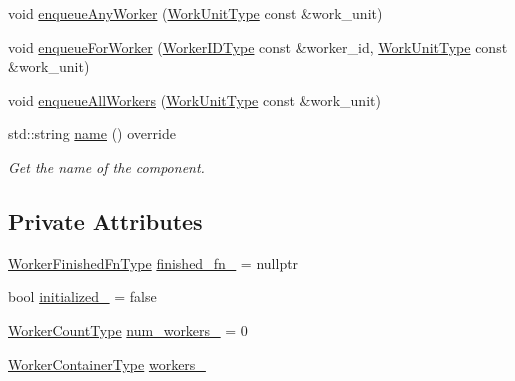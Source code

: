 \begin{DoxyCompactItemize}
\item 
void \hyperlink{structvt_1_1worker_1_1_worker_group_any_a9f8a255853db11824212dcba4faaaf13}{enqueue\+Any\+Worker} (\hyperlink{namespacevt_1_1worker_a59d2fcdafa81fc0af7f921a258e42202}{Work\+Unit\+Type} const \&work\+\_\+unit)
\item 
void \hyperlink{structvt_1_1worker_1_1_worker_group_any_a7f800682c86f876c626d3ee1b9735680}{enqueue\+For\+Worker} (\hyperlink{namespacevt_a656e362091da17b9b93d0655b36e3392}{Worker\+I\+D\+Type} const \&worker\+\_\+id, \hyperlink{namespacevt_1_1worker_a59d2fcdafa81fc0af7f921a258e42202}{Work\+Unit\+Type} const \&work\+\_\+unit)
\item 
void \hyperlink{structvt_1_1worker_1_1_worker_group_any_a87944f965a0e1a918257be0ceff011a5}{enqueue\+All\+Workers} (\hyperlink{namespacevt_1_1worker_a59d2fcdafa81fc0af7f921a258e42202}{Work\+Unit\+Type} const \&work\+\_\+unit)
\item 
std\+::string \hyperlink{structvt_1_1worker_1_1_worker_group_any_a29dc03c300f442508501671d9ec1eecd}{name} () override
\begin{DoxyCompactList}\small\item\em Get the name of the component. \end{DoxyCompactList}\end{DoxyCompactItemize}
\subsection*{Private Attributes}
\begin{DoxyCompactItemize}
\item 
\hyperlink{namespacevt_1_1worker_ae32a174a5348d27aafe73c2debea1a94}{Worker\+Finished\+Fn\+Type} \hyperlink{structvt_1_1worker_1_1_worker_group_any_ad4f81de6e1790126e507cde8e54ed864}{finished\+\_\+fn\+\_\+} = nullptr
\item 
bool \hyperlink{structvt_1_1worker_1_1_worker_group_any_a3075586e7c554a3d2ca71d657a084b5e}{initialized\+\_\+} = false
\item 
\hyperlink{namespacevt_aa93398ea48f2cb6c188512250f7cc248}{Worker\+Count\+Type} \hyperlink{structvt_1_1worker_1_1_worker_group_any_a84a8e36ce6d70e66b712ce04f224fd64}{num\+\_\+workers\+\_\+} = 0
\item 
\hyperlink{structvt_1_1worker_1_1_worker_group_any_ad7e74c099f11c75bc35c838baedaa2cd}{Worker\+Container\+Type} \hyperlink{structvt_1_1worker_1_1_worker_group_any_a370802bca31db13895b73f19d699ea3b}{workers\+\_\+}
\end{DoxyCompactItemize}
